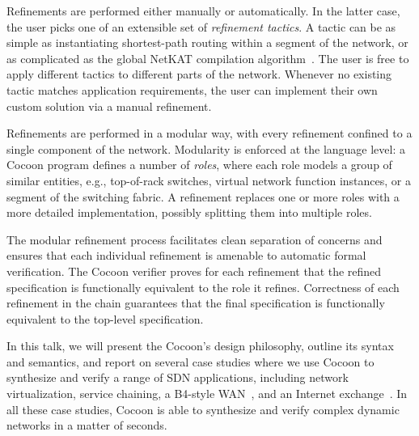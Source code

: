 \documentclass[letterpaper,10pt,twocolumn]{article}
\begin{document}
%

Refinements are performed either manually or automatically.  In 
the latter case, the user picks one of an extensible set of 
\emph{refinement tactics}.  A tactic can be as simple as 
instantiating shortest-path routing within a segment of the 
network, or as complicated as the global NetKAT compilation 
algorithm~\cite{Smolka_EFG_15}.  The user is free to apply 
different tactics to different parts of the network.  Whenever no 
existing tactic matches application requirements, the user can 
implement their own custom solution via a manual refinement.

Refinements are performed in a modular way, with every refinement 
confined to a single component of the network.  Modularity is 
enforced at the language level: a Cocoon program defines a number 
of \emph{roles}, where each role models a group of similar 
entities, e.g., top-of-rack switches, virtual network function 
instances, or a segment of the switching fabric.  A refinement 
replaces one or more roles with a more detailed implementation, 
possibly splitting them into multiple roles.  

The modular refinement process facilitates clean separation of 
concerns and ensures that each individual refinement is amenable 
to automatic formal verification.  The Cocoon verifier proves for 
each refinement that the refined specification is functionally 
equivalent to the role it refines.  Correctness of each refinement 
in the chain guarantees that the final specification is 
functionally equivalent to the top-level specification.  


In this talk, we will present the Cocoon's design philosophy, 
outline its syntax and semantics, and report on several case 
studies where we use Cocoon to synthesize and verify a range of 
SDN applications, including network virtualization, service 
chaining, a B4-style WAN~\cite{Jain_KMOPSVWZZZHSV_13}, and an 
Internet exchange~\cite{Gupta_MBCFRV_16}.  In all these case 
studies, Cocoon is able to synthesize and verify complex dynamic 
networks in a matter of seconds.



\setlength{\bibsep}{1pt}
%
\renewcommand{\bibfont}{\footnotesize}


\end{document}
